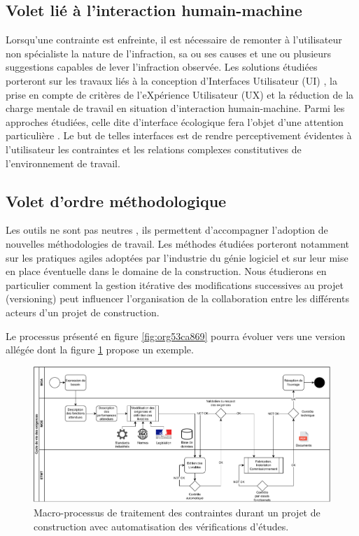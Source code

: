 \documentclass[a4paper,12pt]{article}
\begin{document}
\subsection{Volet lié à l'interaction humain-machine}
\label{sec:orgddd701e}
Lorsqu'une contrainte est enfreinte, il est nécessaire de remonter à l'utilisateur non spécialiste la nature de l'infraction, sa ou ses causes et une ou plusieurs suggestions capables de lever l'infraction observée. Les solutions étudiées porteront sur les travaux liés à la conception d'Interfaces Utilisateur (UI) \autocite{Shneiderman2016}, la prise en compte de critères de l'eXpérience Utilisateur (UX) \autocite{Nogier2020} et la réduction de la charge mentale de travail \autocite{longoHumanMentalWorkload2022a,morayMentalWorkloadIts1979a} en situation d'interaction humain-machine. 
Parmi les approches étudiées, celle dite  d'interface écologique fera l'objet d'une attention particulière \autocite{vicenteEcologicalInterfaceDesign1992b,Burns2004}. Le but de telles interfaces est de rendre perceptivement évidentes à l'utilisateur les contraintes et les relations complexes constitutives de l'environnement de travail.
\subsection{Volet d'ordre méthodologique}
\label{sec:orgfb53348}
Les outils ne sont pas neutres \autocite{borremansGuideConvivialTools1979a}, ils permettent d'accompagner l'adoption de nouvelles méthodologies de travail. Les méthodes étudiées porteront notamment sur les pratiques agiles adoptées par l'industrie du génie logiciel et sur leur mise en place éventuelle dans le domaine de la construction. Nous étudierons en particulier comment la gestion itérative des modifications successives au projet (versioning) peut influencer l'organisation de la collaboration entre les différents acteurs d'un projet de construction.

Le processus présenté en figure \ref{fig:org53ca869} pourra évoluer vers une version allégée dont la figure \ref{fig:org73f51f3} propose un exemple.

\begin{figure}[htbp]
\centering
\includegraphics[width=.9\linewidth]{../svg/BPMN-LifeCycle-Exigences-target.pdf}
\caption{\label{fig:org73f51f3}Macro-processus de traitement des contraintes durant un projet de construction avec automatisation des vérifications d’études.}
\end{figure}
\end{document}
